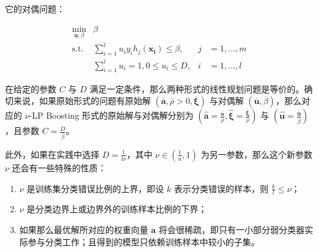 \documentclass[12pt]{ctexart}
\begin{document}
    它的对偶问题：

    \begin{align*}
        \min_{\pmb{u},\beta} & \beta & & \\
        \text{s.t.} & \sum_{i=1}^l u_i y_i h_j(\pmb{x_i}) \leq \beta, & j &= 1,\ldots,m \\
         & \sum_{i=1}^l u_i = 1, 0 \leq u_i \leq D, & i &= 1,\ldots,l
    \end{align*}

    在给定的参数 $C$ 与 $D$ 满足一定条件，那么两种形式的线性规划问题是等价的。确切来说，如果原始形式的问题有原始解 $(\pmb{\overline{a}}, \overline{\rho} > 0, \pmb{\overline{\xi}})$ 与对偶解 $(\pmb{\overline{u}}, \overline{\beta})$，那么对应的 $\nu$-LP Boosting 形式的原始解与对偶解分别为 $(\pmb{\widehat{a}} = \frac{\pmb{\overline{a}}}{\overline{\rho}}, \pmb{\widehat{\xi}} = \frac{\pmb{\overline{\xi}}}{\overline{\rho}})$ 与 $(\pmb{\widehat{u}} = \frac{\pmb{\overline{u}}}{\overline{\beta}})$，且参数 $C = \frac{D}{\overline{\beta}}$。

    此外，如果在实践中选择 $D = \frac{1}{l\nu}$，其中 $\nu \in (\frac{1}{n}, 1)$ 为另一参数，那么这个新参数 $\nu$ 还会有一些特殊的性质：

    \begin{enumerate}
        \item $\nu$ 是训练集分类错误比例的上界，即设 $k$ 表示分类错误的样本，则 $\frac{k}{l} \leq \nu$；
        \item $\nu$ 是分类边界上或边界外的训练样本比例的下界；
        \item 如果那么最优解所对应的权重向量 $\pmb{a}$ 将会很稀疏，即只有一小部分弱分类器实际参与分类工作；且得到的模型只依赖训练样本中较小的子集。
    \end{enumerate}
\end{document}
